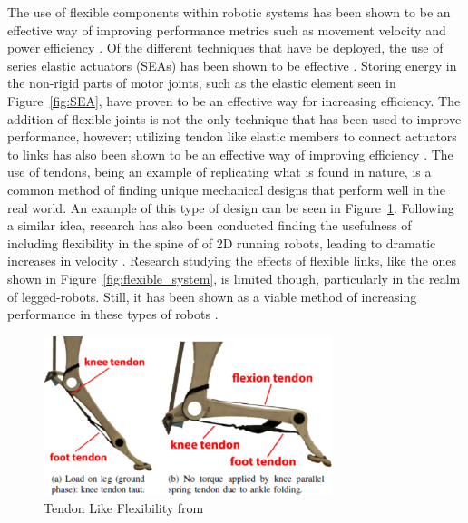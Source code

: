 The use of flexible components within robotic systems has been shown to be an effective way of improving performance metrics such as movement velocity and power efficiency \cite{Seok2015,Hurst2008}. Of the different techniques that have be deployed, the use of series elastic actuators (SEAs) has been shown to be effective \cite{Pratt1995,Ahmadi1997}. Storing energy in the non-rigid parts of motor joints, such as the elastic element seen in Figure~\ref{fig:SEA}, have proven to be an effective way for increasing efficiency. The addition of flexible joints is not the only technique that has been used to improve performance, however; utilizing tendon like elastic members to connect actuators to links has also been shown to be an effective way of improving efficiency \cite{Folkertsma2012}. The use of tendons, being an example of replicating what is found in nature, is a common method of finding unique mechanical designs that perform well in the real world. An example of this type of design can be seen in Figure~\ref{fig:tendon_leg}. Following a similar idea, research has also been conducted finding the usefulness of including flexibility in the spine of of 2D running robots, leading to dramatic increases in velocity \cite{Kani2013}. Research studying the effects of flexible links, like the ones shown in Figure~\ref{fig:flexible_system}, is limited though, particularly in the realm of legged-robots. Still, it has been shown as a viable method of increasing performance in these types of robots \cite{Horigomed}.
%
\begin{figure}[tb!]
  \centering
    \includegraphics[width=0.75\textwidth]{Figures/Ch1/tendon_leg.png}
    \caption{Tendon Like Flexibility from \cite{Folkertsma2012}}
    \label{fig:tendon_leg}    
\end{figure}
% 

